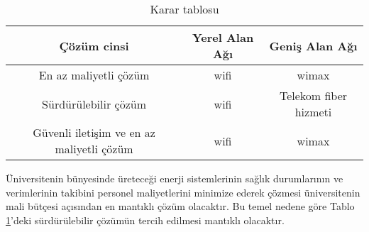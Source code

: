 \begin{table}[htbp]
\centering
\caption{Karar tablosu}
\label{tab:tablo5-1}
\begin{tabular}{|c|c|c|}
\hline
Çözüm cinsi                               & Yerel Alan Ağı & Geniş Alan Ağı        \\ \hline
En az maliyetli çözüm                     & \gls{wifi}           & \gls{wimax}                 \\ \hline
Sürdürülebilir çözüm                      & \gls{wifi}           & Telekom fiber hizmeti \\ \hline
Güvenli iletişim ve en az maliyetli çözüm & \gls{wifi}           & \gls{wimax}                 \\ \hline
\end{tabular}
\end{table}


Üniversitenin bünyesinde üreteceği enerji sistemlerinin sağlık durumlarının ve verimlerinin takibini personel maliyetlerini minimize ederek çözmesi üniversitenin mali bütçesi açısından en mantıklı çözüm olacaktır. Bu temel nedene göre Tablo \ref{tab:tablo5-1}'deki sürdürülebilir çözümün tercih edilmesi mantıklı olacaktır.